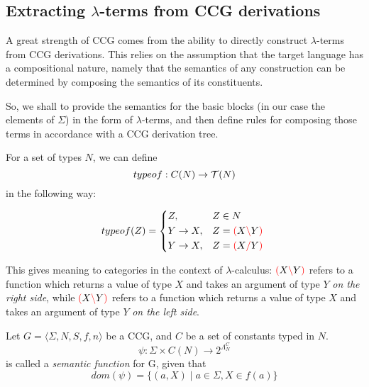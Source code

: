 \documentclass[main.tex]{subfiles}
\begin{document}
\subsection{Extracting $\lambda$-terms from CCG derivations}

A great strength of CCG comes from the ability to directly construct $\lambda$-terms
from CCG derivations. This relies on the assumption that the target
language has a compositional nature, namely that the semantics of any construction
can be determined by composing the semantics of its constituents.

So, we shall to provide the semantics for the basic blocks (in our case
the elements of $\Sigma$) in the form of $\lambda$-terms, and then define rules
for composing those terms in accordance with a CCG derivation tree.

\begin{defn}
    For a set of types $N$, we can define
    \[ typeof : C(N) \rightarrow \mathcal{T}( N ) \]
    in the following way:

    \[
        typeof(Z) =
        \begin{cases*}
            Z, & $Z \in N$ \\
            Y \tot X, & $Z = \lp X \lc Y \rp$ \\
            Y \tot X, & $Z = \lp X \rc Y \rp$ \\
        \end{cases*}
    \]

    This gives meaning to categories in the context of $\lambda$-calculus:
    $\textcolor{red}{(} X \textcolor{red}{\backslash} Y \textcolor{red}{)}$ refers to a function which returns a value of type
    $X$ and takes an argument of type $Y$ \emph{on the right side}, while
    $\textcolor{red}{(} X \textcolor{red}{\backslash} Y \textcolor{red}{)}$ refers to a function which returns a value of type
    $X$ and takes an argument of type $Y$ \emph{on the left side}.
\end{defn}

\begin{defn}
    Let $ G = \langle \Sigma, N, S, f, n \rangle $ be a CCG, and $C$ be a set
    of constants typed in $N$.
    \[ \psi : \Sigma \times C(N) \rightarrow 2^{\Lambda_N^C} \] is called a
    \emph{semantic function} for G, given that
    \[ dom(\psi) = \{ (a, X) \mid a \in \Sigma, X \in f(a) \} \]
\end{defn}
\end{document}
